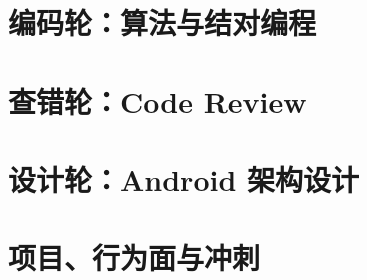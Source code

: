 \documentclass[11pt, a4paper, openany]{book}
\begin{document}
\part{编码轮：算法与结对编程}



\part{查错轮：Code Review}





\part{设计轮：Android 架构设计}




\part{项目、行为面与冲刺}

\end{document}

